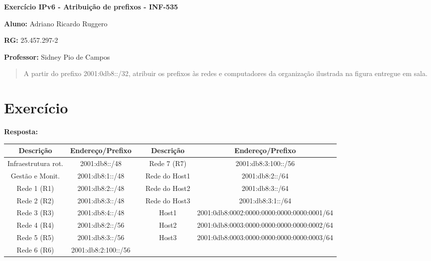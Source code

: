 \documentclass[12pt,twoside,a4paper]{article}
\begin{document}
\vskip 15mm

\begin{center} 
\textbf{Exercício IPv6 - Atribuição de prefixos - INF-535}

\end{center}

\vskip 5mm

\textbf{Aluno:} Adriano Ricardo Ruggero

\textbf{RG:} 25.457.297-2

\textbf{Professor:} Sidney Pio de Campos

\vskip 20mm

\begin{abstract}
A partir do prefixo 2001:0db8::/32, atribuir os prefixos às redes e computadores da organização ilustrada na figura entregue em sala.


\end{abstract}

\newpage
\pagestyle{plain}
\headheight 0.0cm
\headsep 0.0cm
\footskip 2.2cm

\section{Exercício}
\label{sec:01}

\textbf{Resposta:} 

\begin{table}[H]
\label{tab:printers}
\begin{small}
\begin{center}
    \begin{tabular}{ | c | c | c | c | c |}
    \hline
Descrição & Endereço/Prefixo &  & Descrição & Endereço/Prefixo\\ \hline
Infraestrutura rot. & 2001:db8::/48 &  & Rede 7 (R7) & 2001:db8:3:100::/56\\\hline
Gestão e Monit. & 2001:db8:1::/48 &  & Rede do Host1 & 2001:db8:2::/64\\\hline
Rede 1 (R1) & 2001:db8:2::/48 &  & Rede do Host2 & 2001:db8:3::/64\\\hline
Rede 2 (R2) & 2001:db8:3::/48 &  & Rede do Host3 & 2001:db8:3:1::/64\\\hline
Rede 3 (R3) & 2001:db8:4::/48 &  & Host1 & 2001:0db8:0002:0000:0000:0000:0000:0001/64\\\hline
Rede 4 (R4) & 2001:db8:2::/56 &  & Host2 & 2001:0db8:0003:0000:0000:0000:0000:0002/64\\\hline
Rede 5 (R5) & 2001:db8:3::/56 &  & Host3 & 2001:0db8:0003:0000:0000:0000:0000:0003/64\\\hline
Rede 6 (R6) & 2001:db8:2:100::/56 &  &  & \\
\hline
    \end{tabular}
\end{center}    
\end{small}
\end{table}
\end{document}
